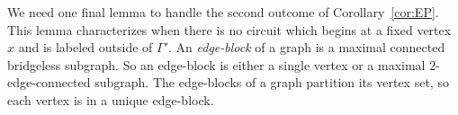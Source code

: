 \documentclass[11pt]{article}
\theoremstyle{definition}
\begin{document}

We need one final lemma to handle the second outcome of Corollary~\ref{cor:EP}. This lemma characterizes when there is no circuit which begins at a fixed vertex $x$ and is labeled outside of $\Gamma'$. An \textit{edge-block} of a graph is a maximal connected bridgeless subgraph. So an edge-block is either a single vertex or a maximal $2$-edge-connected subgraph. The edge-blocks of a graph partition its vertex set, so each vertex is in a unique edge-block.


\end{document}
